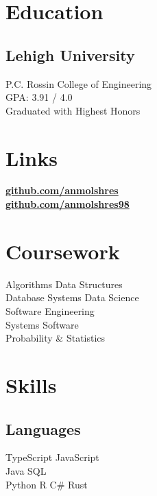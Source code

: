 \documentclass[]{deedy-resume-openfont}
\begin{document}
\lastupdated


\begin{minipage}[t]{0.30\textwidth}

\section{Education}
\subsection{Lehigh University}
P.C. Rossin College of Engineering \\
GPA: 3.91 / 4.0 \\
Graduated with Highest Honors \\
\sectionsep

\section{Links}
\href{https://github.com/anmolshres}{\bf github.com/anmolshres} \\
\href{https://github.com/anmolshres98}{\bf github.com/anmolshres98}
\sectionsep

\section{Coursework}
Algorithms \textbullet{} Data Structures \\
Database Systems \textbullet{} Data Science \\
Software Engineering \\ Systems Software \\
Probability \& Statistics \\
\sectionsep

\section{Skills}
\subsection{Languages}
TypeScript \textbullet{} JavaScript \\
Java \textbullet{} SQL \\
Python \textbullet{} R \textbullet{} C\# \textbullet{} Rust \\
\sectionsep

\end{minipage}
\end{document}
